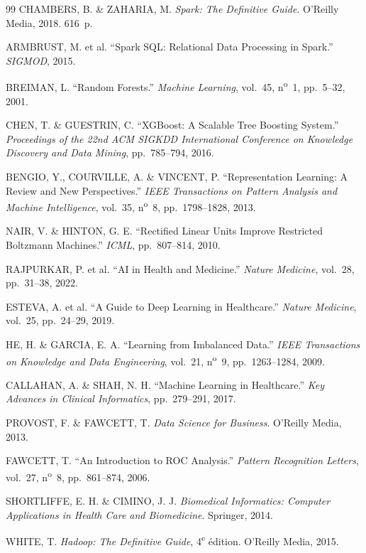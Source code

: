 \documentclass[12pt,a4paper]{report}
\begin{document}
\begin{thebibliography}{99}
CHAMBERS, B. \& ZAHARIA, M.
\textit{Spark: The Definitive Guide}.
O'Reilly Media, 2018. 616~p.

ARMBRUST, M. et al.
``Spark SQL: Relational Data Processing in Spark.''
\textit{SIGMOD}, 2015.

BREIMAN, L.
``Random Forests.''
\textit{Machine Learning}, vol.~45, n\textsuperscript{o}~1, pp.~5--32, 2001.

CHEN, T. \& GUESTRIN, C.
``XGBoost: A Scalable Tree Boosting System.''
\textit{Proceedings of the 22nd ACM SIGKDD International Conference on Knowledge
Discovery and Data Mining}, pp.~785--794, 2016.

BENGIO, Y., COURVILLE, A. \& VINCENT, P.
``Representation Learning: A Review and New Perspectives.''
\textit{IEEE Transactions on Pattern Analysis and Machine Intelligence},
vol.~35, n\textsuperscript{o}~8, pp.~1798--1828, 2013.

NAIR, V. \& HINTON, G. E.
``Rectified Linear Units Improve Restricted Boltzmann Machines.''
\textit{ICML}, pp.~807--814, 2010.

RAJPURKAR, P. et al.
``AI in Health and Medicine.''
\textit{Nature Medicine}, vol.~28, pp.~31--38, 2022.

ESTEVA, A. et al.
``A Guide to Deep Learning in Healthcare.''
\textit{Nature Medicine}, vol.~25, pp.~24--29, 2019.

HE, H. \& GARCIA, E. A.
``Learning from Imbalanced Data.''
\textit{IEEE Transactions on Knowledge and Data Engineering}, vol.~21,
n\textsuperscript{o}~9, pp.~1263--1284, 2009.

CALLAHAN, A. \& SHAH, N. H.
``Machine Learning in Healthcare.''
\textit{Key Advances in Clinical Informatics}, pp.~279--291, 2017.

PROVOST, F. \& FAWCETT, T.
\textit{Data Science for Business}.
O'Reilly Media, 2013.

FAWCETT, T.
``An Introduction to ROC Analysis.''
\textit{Pattern Recognition Letters}, vol.~27, n\textsuperscript{o}~8,
pp.~861--874, 2006.

SHORTLIFFE, E. H. \& CIMINO, J. J.
\textit{Biomedical Informatics: Computer Applications in Health Care and Biomedicine}.
Springer, 2014.

WHITE, T.
\textit{Hadoop: The Definitive Guide}, 4\textsuperscript{e} édition.
O'Reilly Media, 2015.


\end{thebibliography}
\end{document}
